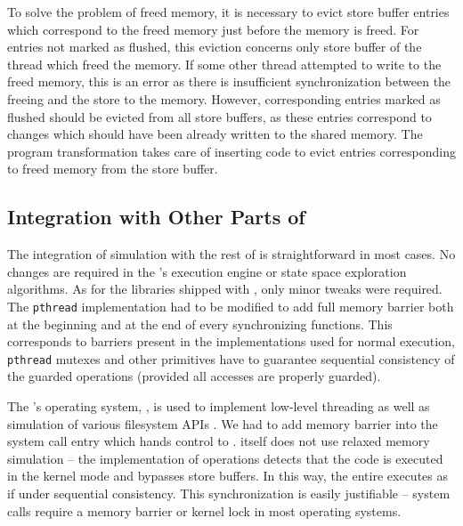To solve the problem of freed memory, it is necessary to evict store buffer entries which correspond to the freed memory just before the memory is freed.
For entries not marked as flushed, this eviction concerns only store buffer of the thread which freed the memory.
If some other thread attempted to write to the freed memory, this is an error as there is insufficient synchronization between the freeing and the store to the memory.
However, corresponding entries marked as flushed should be evicted from all store buffers, as these entries correspond to changes which should have been already written to the shared memory.
The program transformation takes care of inserting code to evict entries corresponding to freed memory from the store buffer.

\subsection{Integration with Other Parts of \divine}

The integration of \xtso simulation with the rest of \divine is straightforward in most cases.
No changes are required in the \divine's execution engine or state space exploration algorithms.
As for the libraries shipped with \divine, only minor tweaks were required.
The \texttt{pthread} implementation had to be modified to add full memory barrier both at the beginning and at the end of every synchronizing functions.
This corresponds to barriers present in the implementations used for normal execution, \texttt{pthread} mutexes and other primitives have to guarantee sequential consistency of the guarded operations (provided all accesses are properly guarded).

The \divine's operating system, \dios, is used to implement low-level threading as well as simulation of various filesystem APIs .
We had to add memory barrier into the system call entry which hands control to \dios.
\dios itself does not use relaxed memory simulation -- the implementation of \xtso operations detects that the code is executed in the kernel mode and bypasses store buffers.
In this way, the entire \dios executes as if under sequential consistency.
This synchronization is easily justifiable -- system calls require a memory barrier or kernel lock in most operating systems.

